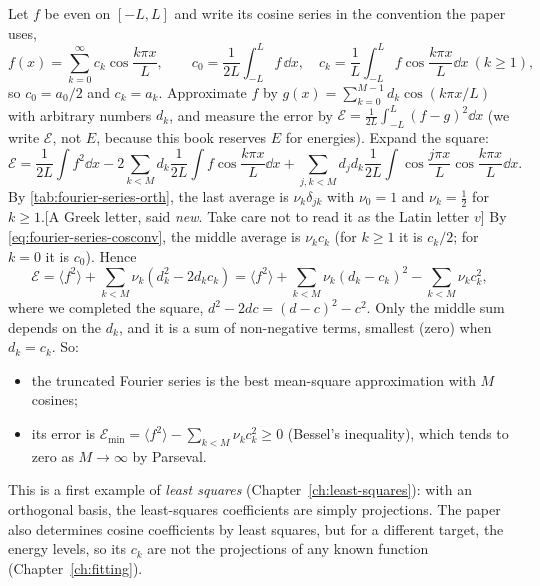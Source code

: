 Let $f$ be even on $[-L,L]$ and write its cosine series in the convention the paper uses,
\begin{equation}
f(x)=\sum_{k=0}^{\infty}c_k\cos\frac{k\pi x}{L},\qquad c_0=\frac1{2L}\int_{-L}^{L}f\,\dd x,\quad c_k=\frac1L\int_{-L}^{L}f\cos\frac{k\pi x}{L}\dd x\ (k\ge1),
\label{eq:fourier-series-cosconv}
\end{equation}
so $c_0=a_0/2$ and $c_k=a_k$. Approximate $f$ by $g(x)=\sum_{k=0}^{M-1}d_k\cos(k\pi x/L)$ with arbitrary numbers $d_k$, and measure the error by $\mathcal{E}=\frac1{2L}\int_{-L}^{L}(f-g)^2\dd x$ (we write $\mathcal{E}$, not $E$, because this book reserves $E$ for energies). Expand the square:
\begin{equation}
\mathcal{E}=\frac1{2L}\int f^2\dd x-2\sum_{k<M}d_k\frac1{2L}\int f\cos\frac{k\pi x}{L}\dd x+\sum_{j,k<M}d_jd_k\frac1{2L}\int\cos\frac{j\pi x}{L}\cos\frac{k\pi x}{L}\dd x .
\end{equation}
By \cref{tab:fourier-series-orth}, the last average is $\nu_k\delta_{jk}$ with $\nu_0=1$ and $\nu_k=\tfrac12$ for $k\ge1$.[A Greek letter, said \emph{new}. Take care not to read it as the Latin letter $v$] By \cref{eq:fourier-series-cosconv}, the middle average is $\nu_kc_k$ (for $k\ge1$ it is $c_k/2$; for $k=0$ it is $c_0$). Hence
\begin{equation}
\mathcal{E}=\langle f^2\rangle+\sum_{k<M}\nu_k\left(d_k^2-2d_kc_k\right)
=\langle f^2\rangle+\sum_{k<M}\nu_k(d_k-c_k)^2-\sum_{k<M}\nu_kc_k^2,
\label{eq:fourier-series-best}
\end{equation}
where we completed the square, $d^2-2dc=(d-c)^2-c^2$. Only the middle sum depends on the $d_k$, and it is a sum of non-negative terms, smallest (zero) when $d_k=c_k$. So:
\begin{itemize}
\item the truncated Fourier series is the best mean-square approximation with $M$ cosines;
\item its error is $\mathcal{E}_{\min}=\langle f^2\rangle-\sum_{k<M}\nu_kc_k^2\ge0$ (Bessel's inequality), which tends to zero as $M\to\infty$ by Parseval.
\end{itemize}
This is a first example of \emph{least squares} (Chapter~\ref{ch:least-squares}): with an orthogonal basis, the least-squares coefficients are simply projections. The paper also determines cosine coefficients by least squares, but for a different target, the energy levels, so its $c_k$ are not the projections of any known function (Chapter~\ref{ch:fitting}).


